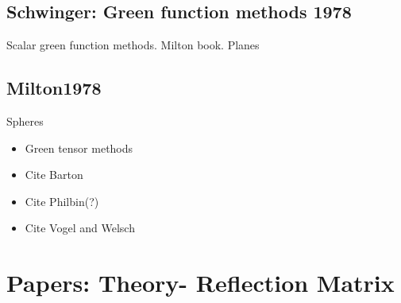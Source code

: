 \subsection{Schwinger: Green function methods 1978}

\cite{Schwinger1978, Milton1978}

Scalar green function methods.  Milton book.  
Planes

\subsection{Milton1978}
Spheres

\begin{itemize}
\item Green tensor methods
\item Cite Barton
\item Cite Philbin(?)
\item Cite Vogel and Welsch
\end{itemize}

\section{Papers: Theory- Reflection Matrix}

